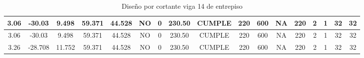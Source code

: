 \begin{table}[H]
{\begin{tabular}{|c|c|c|c|c|c|c|c|c|c|c|c|c|c|c|c|c|}
    \hline
    3.06  & -30.03 & 9.498 & 59.371 & 44.528 & NO    & 0     & 230.50 & CUMPLE & 220   & 600   & NA    & 220   & 2     & 1     & 32    & 32 \bigstrut\\
    \hline
    3.06  & -30.03 & 9.498 & 59.371 & 44.528 & NO    & 0     & 230.50 & CUMPLE & 220   & 600   & NA    & 220   & 2     & 1     & 32    & 32 \bigstrut\\
    \hline
    3.26  & -28.708 & 11.752 & 59.371 & 44.528 & NO    & 0     & 230.50 & CUMPLE & 220   & 600   & NA    & 220   & 2     & 1     & 32    & 32 \bigstrut\\
    \hline
    \end{tabular}}%
  \caption{Diseño por cortante viga 14 de entrepiso}
  \label{tab:Cort V14E}%
\end{table}%

